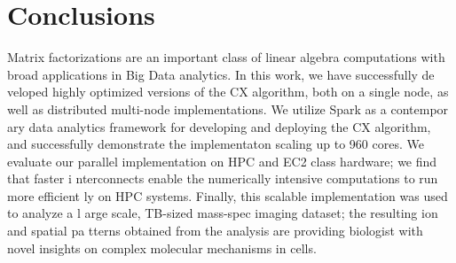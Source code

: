\section{Conclusions}
\label{sec:conclusion}

Matrix factorizations are an important class of linear algebra computations with
 broad applications in Big Data analytics. In this work, we have successfully de
veloped highly optimized versions of the CX algorithm, both on a single node, as
 well as distributed multi-node implementations. We utilize Spark as a contempor
ary data analytics framework for developing and deploying the CX algorithm, and 
successfully demonstrate the implementaton scaling up to 960 cores. We evaluate 
our parallel implementation on HPC and EC2 class hardware; we find that faster i
nterconnects enable the numerically intensive computations to run more efficient
ly on HPC systems. Finally, this scalable implementation was used to analyze a l
arge scale, TB-sized mass-spec imaging dataset; the resulting ion and spatial pa
tterns obtained from the analysis are providing biologist with novel insights on
 complex molecular mechanisms in cells. 
